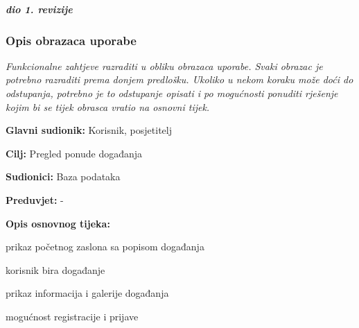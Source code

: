 				\textbf{\textit{dio 1. revizije}}
				
				\subsubsection{Opis obrazaca uporabe}
					\textit{Funkcionalne zahtjeve razraditi u obliku obrazaca uporabe. Svaki obrazac je potrebno razraditi prema donjem predlošku. Ukoliko u nekom koraku može doći do odstupanja, potrebno je to odstupanje opisati i po mogućnosti ponuditi rješenje kojim bi se tijek obrasca vratio na osnovni tijek.}\\
					

					\noindent {}
					\begin{packed_item}
	
						\item \textbf{Glavni sudionik: }Korisnik, posjetitelj
						\item  \textbf{Cilj:} Pregled ponude događanja
						\item  \textbf{Sudionici:} Baza podataka
						\item  \textbf{Preduvjet:} -
						\item  \textbf{Opis osnovnog tijeka:}
						
						\item[] \begin{packed_enum}
	
							\item prikaz početnog zaslona sa popisom događanja
							\item korisnik bira događanje 
							\item prikaz informacija i galerije događanja
							\item mogućnost registracije i prijave
						\end{packed_enum}
						
					\end{packed_item}
					
